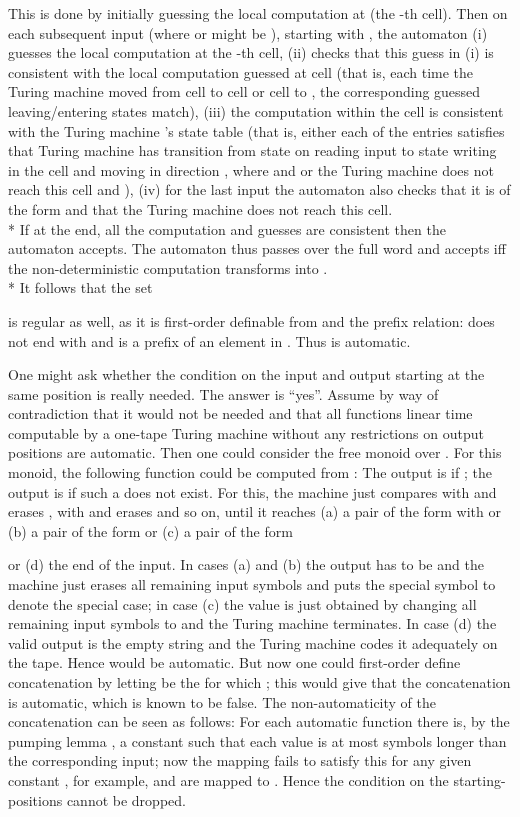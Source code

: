 \documentclass{LMCS}
\theoremstyle{plain}\newtheorem{athm}[thm]{Theorem}
\theoremstyle{plain}\newtheorem{aprop}[thm]{Proposition}
\theoremstyle{plain}\newtheorem{aprob}[thm]{Open Problem}
\theoremstyle{plain}\newtheorem{acor}[thm]{Corollary}
\theoremstyle{plain}\newtheorem{alem}[thm]{Lemma}
\theoremstyle{definition}\newtheorem{adefn}[thm]{Definition}
\theoremstyle{definition}\newtheorem{arem}[thm]{Remark}
\theoremstyle{plain}\newtheorem{aexmp}[thm]{Example}
\theoremstyle{plain}\newtheorem{aclm}[thm]{Claim}
\def\niceqed{~~}
\def\sp{\\*\indent}
\begin{document}
This is done by initially guessing the local computation at 
(the -th cell).
Then on each subsequent input  (where  or 
might be ), starting with ,
the automaton (i) guesses the local computation at the -th cell, 
(ii) checks that this guess in (i) is consistent with the local
computation guessed
at cell  (that is, each time the Turing machine  moved
from cell  to cell  or cell  to , the corresponding guessed
leaving/entering states match), (iii) the computation within the cell
is consistent with the
Turing machine 's state table (that is, either each of the entries
 satisfies that Turing machine has transition
from state  on reading input  to
state  writing  in the cell and moving in direction
, where  and  or the Turing machine
does not reach this cell and ), (iv) 
for the last input the automaton also checks that it is of the form
 and that the Turing machine  does not reach
this cell.
\sp
If at the end, all the computation and guesses are consistent then the
automaton accepts.
The automaton thus passes over the full word and
accepts  iff the 
non-deterministic computation transforms 
 into 
.
\sp
It follows that the set 

is regular as well, as it is first-order definable from
 and the prefix relation:  
 does not end with  and
 is a prefix of an element in .
Thus  is automatic.\niceqed

\begin{rem}
One might ask whether the condition on the input and output starting at
the same position is really needed. The answer is ``yes''. Assume by way
of contradiction that it would not be needed and that all functions linear
time computable by a one-tape Turing machine without any restrictions on
output positions are automatic. Then one could consider the free monoid
over . For this monoid, the following function could be computed
from : The output is  if ; the output is 
if such a  does not exist. For this, the machine just compares  with
 and erases ,  with  and erases  and so on,
until it reaches (a) a pair of the form  with 
or (b) a pair of the form  or (c) a pair of the form

or (d) the end of the input.
In cases (a) and (b) the output has to be  and the machine just erases
all remaining input symbols and puts the special symbol  to denote the
special case; in case (c) the value  is just obtained by changing
all remaining input symbols  to  and the Turing machine
terminates. In case (d) the valid output is the empty string and the
Turing machine codes it adequately on the tape. Hence  would be
automatic. But now one could first-order define concatenation  by
letting  be the  for which ; this would give
that the concatenation is automatic, which is known to be 
false. The non-automaticity of the concatenation can be seen
as follows: For each automatic function there
is, by the pumping lemma \cite{HMU01}, a constant  such that
each value is at most  symbols longer than the corresponding input; now the
mapping  fails to satisfy this for any given
constant , for example,  and  are
mapped to .
Hence the condition on the starting-positions cannot be dropped.
\end{rem}
\end{document}
